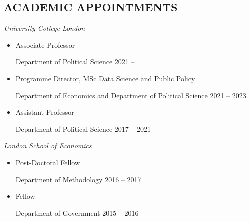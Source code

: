 \documentclass[centered]{res}
\begin{document}
 
\address{Department of Political Science \\ University College London\\ Gower Street \\ London \\ WC1E 6BT }

\address{\faEnvelope \hfil \textcolor{white}{hi}\href{mailto:j.blumenau@ucl.ac.uk}{j.blumenau@ucl.ac.uk} \\ \faHome \hfil\href{http://www.jackblumenau.com}{jackblumenau.com} }%

 
\begin{resume}

\section{ACADEMIC APPOINTMENTS} 

\vspace{.5cm}

\emph{University College London}

\begin{itemize}

\item Associate Professor

Department of Political Science \hfill 2021 --

\item Programme Director, MSc Data Science and Public Policy

Department of Economics and Department of Political Science \hfill 2021 -- 2023

\item Assistant Professor

Department of Political Science \hfill 2017 -- 2021
\end{itemize}

\emph{London School of Economics}

\begin{itemize}
\item Post-Doctoral Fellow

Department of Methodology \hfill 2016 -- 2017

\item Fellow

Department of Government \hfill 2015 -- 2016

\end{itemize}


\end{resume}
\end{document}
